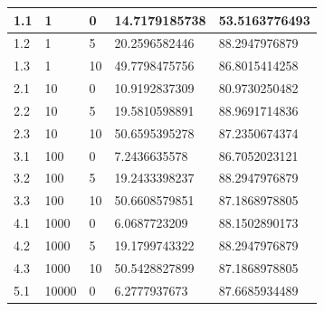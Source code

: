 \documentclass{beamer}
\begin{document}
\begin{frame}[t, allowframebreaks]
\begin{vwcol}[widths={6.5,3.0}, sep=.8cm, justify=flush, rule=0pt, indent=1em]
\begin{minipage}{0.7\linewidth}
\begin{table}[!h]
\begin{tabular}{|p{0.4cm}|p{1.0cm}|p{1.0cm}|p{1.6cm}|p{1.7cm}|}
1.1            & 1                               & 0                                   & 14.7179185738                       & 53.5163776493              \\ \hline
1.2            & 1                               & 5                                   & 20.2596582446                       & 88.2947976879              \\ \hline
1.3            & 1                               & 10                                  & 49.7798475756                       & 86.8015414258              \\ \hline
2.1            & 10                              & 0                                   & 10.9192837309                       & 80.9730250482              \\ \hline
2.2            & 10                              & 5                                   & 19.5810598891                       & 88.9691714836              \\ \hline
2.3            & 10                              & 10                                  & 50.6595395278                       & 87.2350674374              \\ \hline
3.1            & 100                             & 0                                   & 7.2436635578                        & 86.7052023121              \\ \hline
3.2            & 100                             & 5                                   & 19.2433398237                       & 88.2947976879              \\ \hline
3.3            & 100                             & 10                                  & 50.6608579851                       & 87.1868978805              \\ \hline
4.1            & 1000                            & 0                                   & 6.0687723209                        & 88.1502890173              \\ \hline
4.2            & 1000                            & 5                                   & 19.1799743322                       & 88.2947976879              \\ \hline
4.3            & 1000                            & 10                                  & 50.5428827899                       & 87.1868978805              \\ \hline
5.1            & 10000                           & 0                                   & 6.2777937673                        & 87.6685934489              \\ \hline

\end{tabular}
\end{table}
\end{minipage}
\end{vwcol}
\end{frame}
\end{document}
